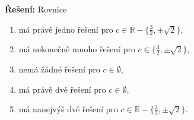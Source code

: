 \textbf{Řešení:} Rovnice
\begin{enumerate}[label=\alph*)]
    \item má právě jedno řešení pro $c\in\mathbb{R}\minus\{\frac{3}{2},\pm\sqrt{2}\}$,
    \item má nekonečně mnoho řešení pro $c\in\{\frac{3}{2},\pm\sqrt{2}\}$,
    \item nemá žádné řešení pro $c\in\emptyset$,
    \item má právě dvě řešení pro $c\in\emptyset$,
    \item má nanejvýš dvě řešení pro $c\in\mathbb{R}\minus\{\frac{3}{2},\pm\sqrt{2}\}$.
\end{enumerate}
